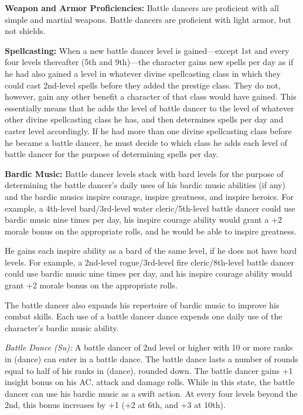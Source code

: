 {
\textbf{Weapon and Armor Proficiencies:} Battle dancers are proficient with all simple and martial weapons. Battle dancers are proficient with light armor, but not shields.

\textbf{Spellcasting:} When a new battle dancer level is gained---except 1st and every four levels thereafter (5th and 9th)---the character gains new spells per day as if he had also gained a level in whatever divine spellcasting class in which they could cast 2nd-level spells before they added the prestige class. They do not, however, gain any other benefit a character of that class would have gained. This essentially means that he adds the level of battle dancer to the level of whatever other divine spellcasting class he has, and then determines spells per day and caster level accordingly. If he had more than one divine spellcasting class before he became a battle dancer, he must decide to which class he adds each level of battle dancer for the purpose of determining spells per day.

\textbf{Bardic Music:} Battle dancer levels stack with bard levels for the purpose of determining the battle dancer's daily uses of his bardic music abilities (if any) and the bardic musics inspire courage, inspire greatness, and inspire heroics. For example, a 4th-level bard/3rd-level water cleric/5th-level battle dancer could use bardic music nine times per day, his inspire courage ability would grant a +2 morale bonus on the appropriate rolls, and he would be able to inspire greatness.

He gains each inspire ability as a bard of the same level, if he does not have bard levels. For example, a 2nd-level rogue/3rd-level fire cleric/8th-level battle dancer could use bardic music nine times per day, and his inspire courage ability would grant +2 morale bonus on the appropriate rolls.

The battle dancer also expands his repertoire of bardic music to improve his combat skills. Each use of a battle dancer dance expends one daily use of the character's bardic music ability.

\textit{Battle Dance (Su):} A battle dancer of 2nd level or higher with 10 or more ranks in  (dance) can enter in a battle dance. The battle dance lasts a number of rounds equal to half of his ranks in  (dance), rounded down. The battle dancer gains +1 insight bonus on his AC, attack and damage rolls. While in this state, the battle dancer can use his bardic music as a swift action. At every four levels beyond the 2nd, this bonus increases by +1 (+2 at 6th, and +3 at 10th).

}
